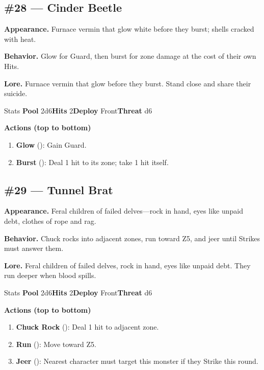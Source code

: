 \subsection*{\#28 --- Cinder Beetle}

\textbf{Appearance.} Furnace vermin that glow white before they burst; shells cracked with heat.

\textbf{Behavior.} Glow for Guard, then burst for zone damage at the cost of their own Hits.

\textbf{Lore.} Furnace vermin that glow before they burst. Stand close and share their suicide.

\begin{monsterentry}{Stats}
\textbf{Pool} 2d6\quad\textbf{Hits} 2\quad\textbf{Deploy} Front\quad\textbf{Threat} d6

\textbf{Actions (top to bottom)}
\begin{enumerate}\setlength{\itemsep}{0.15em}\setlength{\parskip}{0pt}
  \item \textbf{Glow} (\easy): Gain Guard.
  \item \textbf{Burst} (\medium): Deal 1 hit to its zone; take 1 hit itself.
\end{enumerate}
\end{monsterentry}

\subsection*{\#29 --- Tunnel Brat}

\textbf{Appearance.} Feral children of failed delves---rock in hand, eyes like unpaid debt, clothes of rope and rag.

\textbf{Behavior.} Chuck rocks into adjacent zones, run toward Z5, and jeer until Strikes must answer them.

\textbf{Lore.} Feral children of failed delves, rock in hand, eyes like unpaid debt. They run deeper when blood spills.

\begin{monsterentry}{Stats}
\textbf{Pool} 2d6\quad\textbf{Hits} 2\quad\textbf{Deploy} Front\quad\textbf{Threat} d6

\textbf{Actions (top to bottom)}
\begin{enumerate}\setlength{\itemsep}{0.15em}\setlength{\parskip}{0pt}
  \item \textbf{Chuck Rock} (\medium): Deal 1 hit to adjacent zone.
  \item \textbf{Run} (\easy): Move toward Z5.
  \item \textbf{Jeer} (\hard): Nearest character must target this monster if they Strike this round.
\end{enumerate}
\end{monsterentry}


